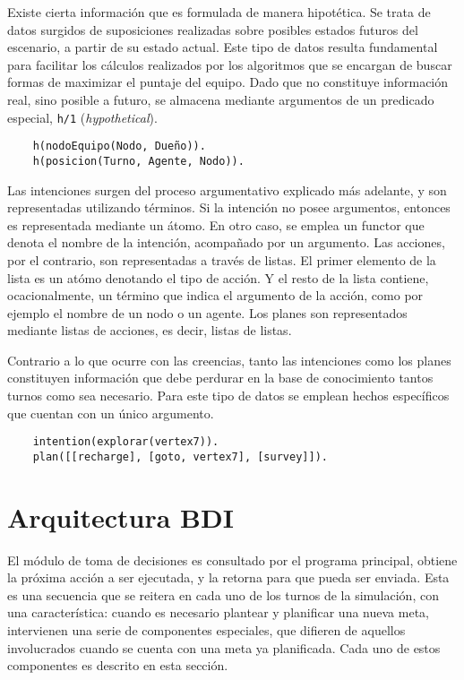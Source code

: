 \documentclass[oneside]{book}
\begin{document}
Existe cierta información que es formulada de manera hipotética. Se trata de datos 
surgidos de suposiciones realizadas sobre posibles estados futuros del escenario, a partir 
de su estado actual. Este tipo de datos resulta fundamental para facilitar los cálculos 
realizados por los algoritmos que se encargan de buscar formas de maximizar el puntaje 
del equipo. Dado que no constituye información real, sino posible a futuro, se almacena 
mediante argumentos de un predicado especial, \texttt{h/1} (\textit{hypothetical}).

\begin{verbatim}
    h(nodoEquipo(Nodo, Dueño)).
    h(posicion(Turno, Agente, Nodo)).    
\end{verbatim}

Las intenciones surgen del proceso argumentativo explicado más adelante, y son 
representadas utilizando términos. Si la intención no posee argumentos, entonces es 
representada mediante un átomo. En otro caso, se emplea un functor que denota el 
nombre de la intención, acompañado por un argumento. Las acciones, por el contrario, 
son representadas a través de listas. El primer elemento de la lista es un atómo denotando 
el tipo de acción. Y el resto de la lista contiene, ocacionalmente, un término que 
indica el argumento de la acción, como por ejemplo el nombre de un nodo o un agente.
Los planes son representados mediante listas de acciones, es decir, listas de listas.

Contrario a lo que ocurre con las creencias, tanto las intenciones como los planes 
constituyen información que debe perdurar en la base de conocimiento tantos turnos 
como sea necesario. Para este tipo de datos se emplean hechos específicos que cuentan 
con un único argumento.

\begin{verbatim}
    intention(explorar(vertex7)).
    plan([[recharge], [goto, vertex7], [survey]]).
\end{verbatim}

\section{Arquitectura BDI} %

\label{sec:arquitecturaBDI}

El módulo de toma de decisiones es consultado por el programa principal, obtiene la 
próxima acción a ser ejecutada, y la retorna para que pueda ser enviada. Esta es una 
secuencia que se reitera en cada uno de los turnos de la simulación, con una característica:
cuando es necesario plantear y planificar una nueva meta, intervienen una serie de 
componentes especiales, que difieren de aquellos involucrados cuando se cuenta con una 
meta ya planificada. Cada uno de estos componentes es descrito en esta sección.
\end{document}
